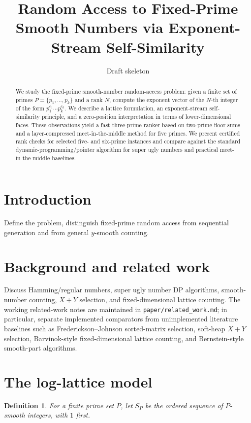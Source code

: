 \documentclass[11pt]{article}
\title{Random Access to Fixed-Prime Smooth Numbers via Exponent-Stream Self-Similarity}
\author{}
\date{Draft skeleton}
\newtheorem{definition}{Definition}
\begin{document}
\maketitle

\begin{abstract}
We study the fixed-prime smooth-number random-access problem: given a finite set of primes $P=\{p_1,\ldots,p_k\}$ and a rank $N$, compute the exponent vector of the $N$-th integer of the form $p_1^{e_1}\cdots p_k^{e_k}$. We describe a lattice formulation, an exponent-stream self-similarity principle, and a zero-position interpretation in terms of lower-dimensional faces. These observations yield a fast three-prime ranker based on two-prime floor sums and a layer-compressed meet-in-the-middle method for five primes. We present certified rank checks for selected five- and six-prime instances and compare against the standard dynamic-programming/pointer algorithm for super ugly numbers and practical meet-in-the-middle baselines.
\end{abstract}

\section{Introduction}
Define the problem, distinguish fixed-prime random access from sequential generation and from general $y$-smooth counting.

\section{Background and related work}
Discuss Hamming/regular numbers, super ugly number DP algorithms, smooth-number counting, $X+Y$ selection, and fixed-dimensional lattice counting. The working related-work notes are maintained in \texttt{paper/related\_work.md}; in particular, separate implemented comparators from unimplemented literature baselines such as Frederickson--Johnson sorted-matrix selection, soft-heap $X+Y$ selection, Barvinok-style fixed-dimensional lattice counting, and Bernstein-style smooth-part algorithms.

\section{The log-lattice model}
\begin{definition}
For a finite prime set $P$, let $S_P$ be the ordered sequence of $P$-smooth integers, with $1$ first.
\end{definition}
\end{document}
